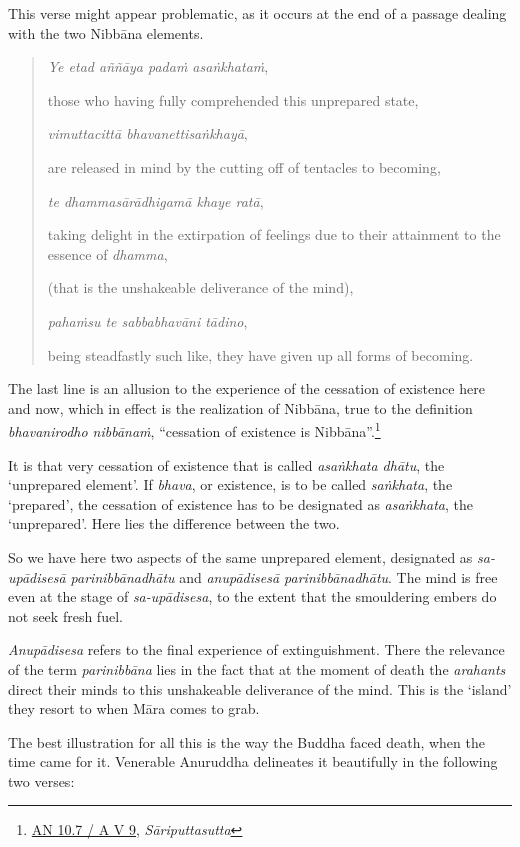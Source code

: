 This verse might appear problematic, as it occurs at the end of a passage dealing with the two Nibbāna elements.

\begin{quote}
\emph{Ye etad aññāya padaṁ asaṅkhataṁ},

those who having fully comprehended this unprepared state,

\emph{vimuttacittā bhavanettisaṅkhayā},

are released in mind by the cutting off of tentacles to becoming,

\emph{te dhammasārādhigamā khaye ratā},

taking delight in the extirpation of feelings due to their attainment to the essence of \emph{dhamma},

(that is the unshakeable deliverance of the mind),

\emph{pahaṁsu te sabbabhavāni tādino},

being steadfastly such like, they have given up all forms of becoming.
\end{quote}

The last line is an allusion to the experience of the cessation of existence here and now, which in effect is the realization of Nibbāna, true to the definition \emph{bhavanirodho nibbānaṁ}, ``cessation of existence is Nibbāna''.\footnote{\href{https://suttacentral.net/an10.7/pli/ms}{AN 10.7 / A V 9}, \emph{Sāriputtasutta}}

It is that very cessation of existence that is called \emph{asaṅkhata dhātu}, the `unprepared element'. If \emph{bhava}, or existence, is to be called \emph{saṅkhata}, the `prepared', the cessation of existence has to be designated as \emph{asaṅkhata}, the `unprepared'. Here lies the difference between the two.

So we have here two aspects of the same unprepared element, designated as \emph{sa-upādisesā parinibbānadhātu} and \emph{anupādisesā parinibbānadhātu}. The mind is free even at the stage of \emph{sa-upādisesa}, to the extent that the smouldering embers do not seek fresh fuel.

\emph{Anupādisesa} refers to the final experience of extinguishment. There the relevance of the term \emph{parinibbāna} lies in the fact that at the moment of death the \emph{arahants} direct their minds to this unshakeable deliverance of the mind. This is the `island' they resort to when Māra comes to grab.

The best illustration for all this is the way the Buddha faced death, when the time came for it. Venerable Anuruddha delineates it beautifully in the following two verses:

